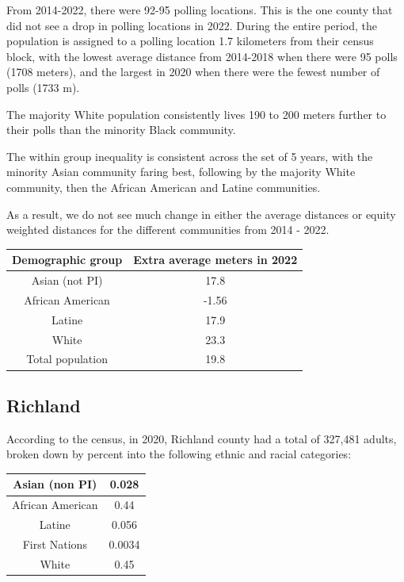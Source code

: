 \documentclass[11pt]{article}
\theoremstyle{remark}
\theoremstyle{definition}
\begin{document}
From 2014-2022, there were 92-95 polling locations. This is the one county that did not see a drop in polling locations in 2022. During the entire period, the population is assigned to a polling location 1.7 kilometers from their census block, with the lowest average distance from 2014-2018 when there were 95 polls (1708 meters), and the largest in 2020 when there were the fewest number of polls (1733 m).

The majority White population consistently lives 190 to 200 meters further to their polls than the minority Black community. 

The within group inequality is consistent across the set of 5 years, with the minority Asian community faring best, following by the majority White community, then the African American and Latine communities. 

As a result, we do not see much change in either the average distances or equity weighted distances for the different communities from 2014 - 2022. 

\begin{tabular}{|c|c|}
	\hline
	Demographic group & Extra average meters in 2022 \\ \hline
	Asian (not PI) &   17.8 \\ \hline
	African American &   -1.56  \\ \hline
	Latine & 17.9 \\ \hline
	White &  23.3\\ \hline
	Total population &  19.8\\ \hline
\end{tabular}


\subsection{Richland \label{sec:Richland distances}}
According to the census, in 2020, Richland county had a total of 327,481  adults, broken down by percent into the following ethnic and racial categories:

\begin{tabular} {| c | c |} 
	\hline
	Asian (non PI) &  0.028 \\ \hline
	African American & 0.44 \\ \hline
	Latine & 0.056 \\ \hline
	First Nations & 0.0034 \\ \hline
	White  & 0.45 \\ \hline
\end{tabular}
\end{document}
